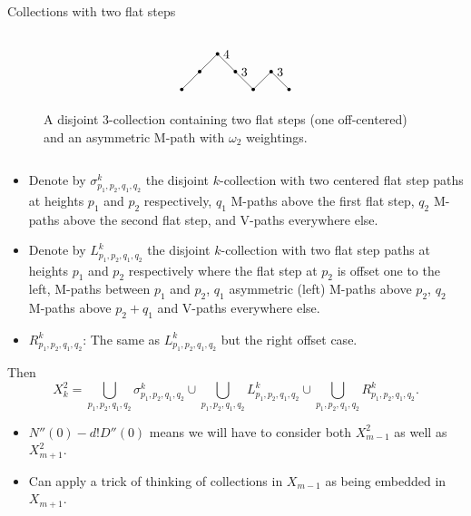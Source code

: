 \documentclass[12pt]{beamer}
\begin{document}
\begin{frame}[allowframebreaks]{Collections with two flat steps}
\begin{columns}
\begin{column}{0.45\textwidth}
\begin{figure}
\begin{equation*}
\begin{tikzpicture}[scale=0.50]
	\node at (0,3) [circle, fill, inner sep=1pt]{};
	\node at (1,4) [circle, fill, inner sep=1pt]{};
	\node at (2,5) [circle, fill, inner sep=1pt]{};
	\node at (3,4) [circle, fill, inner sep=1pt]{};
	\node at (4,3) [circle, fill, inner sep=1pt]{};
	\node at (5,4) [circle, fill, inner sep=1pt]{};
	\node at (6,3) [circle, fill, inner sep=1pt]{};
	\draw (0,3) -- (1,4) -- (2,5);
	\draw (2,5) -- node[above] {4} (3,4);
	\draw (3,4) -- node[above] {3} (4,3);
	\draw (4,3) -- (5,4);
	\draw (5,4) -- node[above] {3} (6,3);
\end{tikzpicture}
\end{equation*}
\caption{\label{fig:asymMpath} A disjoint 3-collection containing two flat steps (one off-centered) and an asymmetric M-path with $\omega_2$ weightings.}
\end{figure}
\end{column}
\end{columns}

\framebreak

\begin{itemize}
\item Denote by $\sigma^k_{p_1,p_2,q_1,q_2}$ the disjoint $k$-collection with two centered flat step paths at heights $p_1$ and $p_2$ respectively, $q_1$ M-paths above the first flat step, $q_2$ M-paths above the second flat step, and V-paths everywhere else.
\item Denote by $L^k_{p_1,p_2,q_1,q_2}$ the disjoint $k$-collection with two flat step paths at heights $p_1$ and $p_2$ respectively where the flat step at $p_2$ is offset one to the left, M-paths between $p_1$ and $p_2$, $q_1$ asymmetric (left) M-paths above $p_2$, $q_2$ M-paths above $p_2+q_1$ and V-paths everywhere else.
\item $R^k_{p_1,p_2,q_1,q_2}$: The same as $L^k_{p_1,p_2,q_1,q_2}$ but the right offset case.
\end{itemize}
Then
\begin{equation*}
X_k^2 = \bigcup\limits_{p_1,p_2,q_1,q_2}\sigma_{p_1,p_2,q_1,q_2}^k \cup \bigcup\limits_{p_1,p_2,q_1,q_2}L_{p_1,p_2,q_1,q_2}^k \cup \bigcup\limits_{p_1,p_2,q_1,q_2}R_{p_1,p_2,q_1,q_2}^k.
\end{equation*}

\framebreak

\begin{itemize}
\item $N''(0)-d!D''(0)$ means we will have to consider both $X_{m-1}^2$ as well as $X_{m+1}^2$.
\item Can apply a trick of thinking of collections in $X_{m-1}$ as being embedded in $X_{m+1}$.
\end{itemize}


\end{frame}
\end{document}
